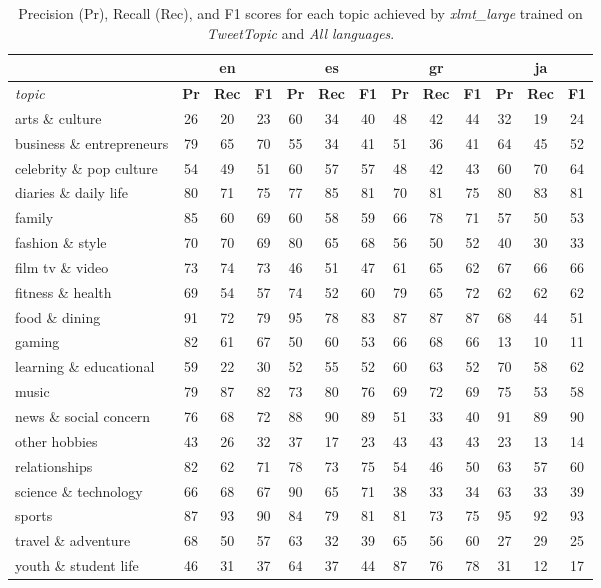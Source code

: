 \begin{table}[]
\begin{tabular}{l|ccc|ccc|ccc|ccc}
\textbf{} &
  \multicolumn{3}{c|}{\textbf{en}} &
  \multicolumn{3}{c|}{\textbf{es}} &
  \multicolumn{3}{c|}{\textbf{gr}} &
  \multicolumn{3}{c}{\textbf{ja}} \\ \hline
\textit{topic} &
  \textbf{Pr} &
  \textbf{Rec} &
  \textbf{F1} &
  \textbf{Pr} &
  \textbf{Rec} &
  \textbf{F1} &
  \textbf{Pr} &
  \textbf{Rec} &
  \textbf{F1} &
  \textbf{Pr} &
  \textbf{Rec} &
  \textbf{F1} \\ \hline
arts \& culture           & 26 & 20 & 23 & 60 & 34 & 40 & 48 & 42 & 44 & 32 & 19 & 24 \\
business \& entrepreneurs & 79 & 65 & 70 & 55 & 34 & 41 & 51 & 36 & 41 & 64 & 45 & 52 \\
celebrity \& pop culture  & 54 & 49 & 51 & 60 & 57 & 57 & 48 & 42 & 43 & 60 & 70 & 64 \\
diaries \& daily life     & 80 & 71 & 75 & 77 & 85 & 81 & 70 & 81 & 75 & 80 & 83 & 81 \\
family                    & 85 & 60 & 69 & 60 & 58 & 59 & 66 & 78 & 71 & 57 & 50 & 53 \\
fashion \& style          & 70 & 70 & 69 & 80 & 65 & 68 & 56 & 50 & 52 & 40 & 30 & 33 \\
film tv \& video          & 73 & 74 & 73 & 46 & 51 & 47 & 61 & 65 & 62 & 67 & 66 & 66 \\
fitness \& health         & 69 & 54 & 57 & 74 & 52 & 60 & 79 & 65 & 72 & 62 & 62 & 62 \\
food \& dining            & 91 & 72 & 79 & 95 & 78 & 83 & 87 & 87 & 87 & 68 & 44 & 51 \\
gaming                    & 82 & 61 & 67 & 50 & 60 & 53 & 66 & 68 & 66 & 13 & 10 & 11 \\
learning \& educational   & 59 & 22 & 30 & 52 & 55 & 52 & 60 & 63 & 52 & 70 & 58 & 62 \\
music                     & 79 & 87 & 82 & 73 & 80 & 76 & 69 & 72 & 69 & 75 & 53 & 58 \\
news \& social concern    & 76 & 68 & 72 & 88 & 90 & 89 & 51 & 33 & 40 & 91 & 89 & 90 \\
other hobbies             & 43 & 26 & 32 & 37 & 17 & 23 & 43 & 43 & 43 & 23 & 13 & 14 \\
relationships             & 82 & 62 & 71 & 78 & 73 & 75 & 54 & 46 & 50 & 63 & 57 & 60 \\
science \& technology     & 66 & 68 & 67 & 90 & 65 & 71 & 38 & 33 & 34 & 63 & 33 & 39 \\
sports                    & 87 & 93 & 90 & 84 & 79 & 81 & 81 & 73 & 75 & 95 & 92 & 93 \\
travel \& adventure       & 68 & 50 & 57 & 63 & 32 & 39 & 65 & 56 & 60 & 27 & 29 & 25 \\
youth \& student life     & 46 & 31 & 37 & 64 & 37 & 44 & 87 & 76 & 78 & 31 & 12 & 17
\end{tabular}
\caption{Precision (Pr), Recall (Rec), and F1 scores for each topic achieved by  \textit{xlmt\_large} trained on  \textit{TweetTopic} and \textit{All languages}.}
\label{tab:xlmt-details}
\end{table}


